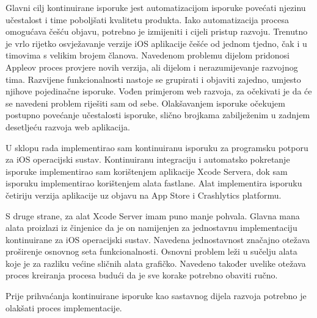 \documentclass[times, utf8, diplomski, numeric]{fer}
\begin{document}
Glavni cilj kontinuirane isporuke jest automatizacijom isporuke povećati njezinu učestalost i time poboljšati kvalitetu produkta. Iako automatizacija procesa omogućava češću objavu, potrebno je izmijeniti i cijeli pristup razvoju. Trenutno je vrlo rijetko osvježavanje verzije iOS aplikacije češće od jednom tjedno, čak i u timovima s velikim brojem članova. Navedenom problemu dijelom pridonosi Appleov proces provjere novih verzija, ali dijelom i nerazumijevanje razvojnog tima. Razvijene funkcionalnosti nastoje se grupirati i objaviti zajedno, umjesto njihove pojedinačne isporuke. Vođen primjerom web razvoja, za očekivati je da će se navedeni problem riješiti sam od sebe. Olakšavanjem isporuke očekujem postupno povećanje učestalosti isporuke, slično brojkama zabilježenim u zadnjem desetljeću razvoja web aplikacija.

U sklopu rada implementirao sam kontinuiranu isporuku za programsku potporu za iOS operacijski sustav. Kontinuiranu integraciju i automatsko pokretanje isporuke implementirao sam korištenjem aplikacije Xcode Servera, dok sam isporuku implementirao korištenjem alata fastlane. Alat implementira isporuku četiriju verzija aplikacije uz objavu na App Store i Crashlytics platformu.

S druge strane, za alat Xcode Server imam puno manje pohvala. Glavna mana alata proizlazi iz činjenice da je on namijenjen za jednostavnu implementaciju kontinuirane za iOS operacijski sustav. Navedena jednostavnost značajno otežava proširenje osnovnog seta funkcionalnosti. Osnovni problem leži u sučelju alata koje je za razliku većine sličnih alata grafičko. Navedeno također uvelike otežava proces kreiranja procesa budući da je sve korake potrebno obaviti ručno.

Prije prihvaćanja kontinuirane isporuke kao sastavnog dijela razvoja potrebno je olakšati proces implementacije.






\end{document}
